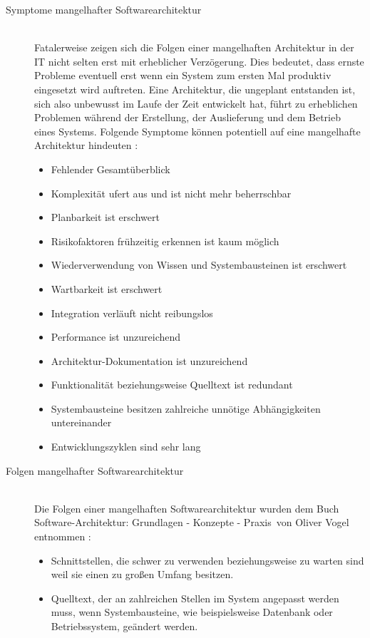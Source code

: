 \begin{description}
\item[Symptome mangelhafter Softwarearchitektur] \hfill \\
  Fatalerweise zeigen sich die Folgen einer mangelhaften Architektur in der IT nicht selten erst mit erheblicher Verzögerung. Dies bedeutet, dass ernste Probleme eventuell erst wenn ein System zum ersten Mal produktiv eingesetzt wird auftreten. Eine Architektur, die ungeplant entstanden ist, sich also unbewusst im Laufe der Zeit entwickelt hat, führt zu erheblichen Problemen während der Erstellung, der Auslieferung und dem Betrieb eines Systems. Folgende Symptome können potentiell auf eine mangelhafte Architektur hindeuten \citereset \autocite[siehe][S. 6-8]{Vogel.2009}:
  \begin{itemize}
  \item Fehlender Gesamtüberblick
  \item Komplexität ufert aus und ist nicht mehr beherrschbar
  \item Planbarkeit ist erschwert
  \item Risikofaktoren frühzeitig erkennen ist kaum möglich
  \item Wiederverwendung von Wissen und Systembausteinen ist erschwert
  \item Wartbarkeit ist erschwert
  \item Integration verläuft nicht reibungslos
  \item Performance ist unzureichend
  \item Architektur-Dokumentation ist unzureichend
  \item Funktionalität beziehungsweise Quelltext ist redundant
  \item Systembausteine besitzen zahlreiche unnötige Abhängigkeiten untereinander
  \item Entwicklungszyklen sind sehr lang
  \end{itemize}
\item[Folgen mangelhafter Softwarearchitektur] \hfill \\
  Die Folgen einer mangelhaften Softwarearchitektur wurden dem Buch \glqq Software-Architektur: Grundlagen - Konzepte - Praxis\grqq\ von Oliver Vogel entnommen \citereset \autocite[siehe][6-8]{Vogel.2009}:
  \begin{itemize}
  \item Schnittstellen, die schwer zu verwenden beziehungsweise zu warten sind weil sie einen zu großen Umfang besitzen.
  \item Quelltext, der an zahlreichen Stellen im System angepasst werden muss, wenn Systembausteine, wie beispielsweise Datenbank oder Betriebssystem, geändert werden.

\end{itemize}
\end{description}
